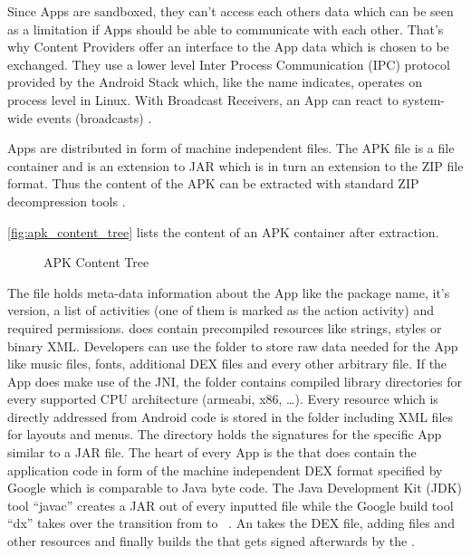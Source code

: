 Since Apps are sandboxed, they can't access each others data which can be seen as a limitation if Apps should be able to communicate with each other.
That's why Content Providers offer an interface to the App
data which is chosen to be exchanged.
They use a lower level Inter Process Communication (IPC) protocol
provided by the Android Stack which, like the name indicates, operates
on process level in Linux.
With Broadcast Receivers, an App can react to system-wide events
(broadcasts) \parencite[ch.1]{securityinternals}.

Apps are distributed in form of machine independent  files.
The APK file is a file container and is an extension to
JAR which is in turn an extension to the ZIP file format.
Thus the content of the APK can be extracted with standard ZIP
decompression tools \parencite{securityinternals}.

\autoref{fig:apk_content_tree} lists the content of an APK container
after extraction.

\begin{figure}[htb]
\caption[APK Content Tree]{APK Content Tree}
\label{fig:apk_content_tree}
\end{figure}

The  file holds meta-data information
about the App like the package name, it's version, a list of
activities (one of them is marked as the action  activity) and required permissions. 
does contain precompiled resources like strings, styles
or binary XML. Developers can use the  folder
to store raw data needed for the App like music files,
fonts, additional DEX files and every other arbitrary file.
If the App does make use of the JNI,
the  folder contains compiled library directories
for every supported CPU architecture (armeabi, x86, \ldots).
Every resource which is directly addressed from Android code
is stored in the  folder including XML files for
layouts and menus. The  directory holds
the signatures for the specific App similar to a JAR file.
The heart of every App is the  that does
contain the application code in form of the machine independent
DEX format specified by Google \parencite{dex} which is comparable to
Java byte code. The Java Development
Kit (JDK) tool ``javac'' creates a JAR out of every inputted
  file while the Google build tool ``dx'' takes over
 the transition from  to  ~\parencite{dxtool}.
 An  takes the DEX file, adding  files and
 other resources and finally builds the  that gets signed
 afterwards by the .

